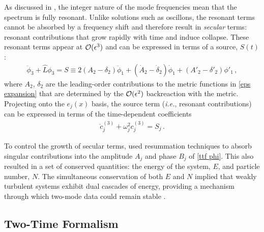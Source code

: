 \documentclass[../PhD.tex]{subfiles}
\begin{document}
As discussed in \cite{1412.3249, 1407.6273, 1508.04943}, the integer nature of the mode frequencies mean that the spectrum is fully resonant. Unlike solutions such as oscillons, the resonant terms cannot be absorbed by a frequency shift and therefore result in \emph{secular} terms: resonant contributions that grow rapidly with time and induce collapse. These resonant terms appear at $\mathcal O (\epsilon^3)$ and can be expressed in terms of a source, $S(t)$:
\begin{align}
\ddot \phi_3 + \hat L \phi_3 = S \equiv 2 (A_2 - \delta_2) \ddot \phi_1 + ( \dot A_2 - \dot \delta_2 ) \dot \phi_1 + (A'_2 - \delta'_2) \phi'_1 \, ,
\end{align}
where $A_2$, $\delta_2$ are the leading-order contributions to the metric functions in \eqref{eps expansion} that are determined by the $\mathcal O(\epsilon^2)$ backreaction with the metric. Projecting onto the $e_j(x)$ basis, the source term ({\it i.e.}, resonant contributions) can be expressed in terms of the time-dependent coefficients
\begin{align}
\ddot c_j^{(3)} + \omega_j^2 c_j^{(3)} = S_j \, .
\end{align}  

To control the growth of secular terms, \cite{1412.3249} used resummation techniques to absorb singular contributions into the amplitude $A_j$ and phase $B_j$ of \eqref{ttf phi}. This also resulted in a set of conserved quantities: the energy of the system, $E$, and particle number, $N$. The simultaneous conservation of both $E$ and $N$ implied that weakly turbulent systems exhibit dual cascades of energy, providing a mechanism through which two-mode data could remain stable \cite{1412.4761}.


\subsection{Two-Time Formalism}
\end{document}
